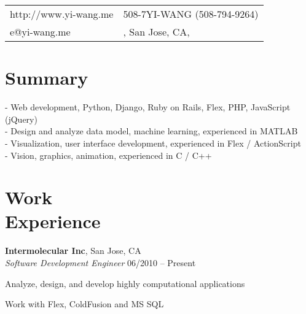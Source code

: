 \documentclass[margin,line]{resume}
\begin{document}
\begin{resume}

      \begin{tabular}{@{}p{6cm}p{8.5cm}}
      http://www.yi-wang.me  &  508-7YI-WANG (508-794-9264)           \\
      e@yi-wang.me             &  , San Jose, CA,  \\
      \end{tabular}

 
    \section{\mysidestyle Summary}
      
      - Web development, Python, Django, Ruby on Rails, Flex, PHP, JavaScript (jQuery) \\
      - Design and analyze data model, machine learning, experienced in MATLAB \\
      - Visualization, user interface development, experienced in Flex / ActionScript \\
      - Vision, graphics, animation, experienced in C / C++
      

    \section{\mysidestyle Work \\ Experience}

    \textbf{Intermolecular Inc}, San Jose, CA \\
    \textsl{Software Development Engineer} \hfill 06/2010 -- Present \vspace{-3mm}\\\vspace{-1mm}%
      \begin{list2}
      \item Analyze, design, and develop highly computational applications
      \item Work with Flex, ColdFusion and MS SQL
      \end{list2}


\end{resume}
\end{document}
